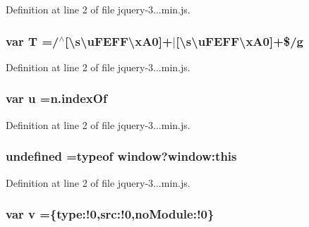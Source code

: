 Definition at line 2 of file jquery-\/3...\+min.\+js.

\subsubsection[{T}]{\setlength{\rightskip}{0pt plus 5cm}var T =/$^\wedge$[\textbackslash{}s\textbackslash{}u\+F\+E\+F\+F\textbackslash{}x\+A0]+$\vert$[\textbackslash{}s\textbackslash{}u\+F\+E\+F\+F\textbackslash{}x\+A0]+\$/{\bf g}}\label{jquery-3_83_81_8min_8js_aa798e0c32253f973f3154aa30c996eb2}


Definition at line 2 of file jquery-\/3...\+min.\+js.

\subsubsection[{u}]{\setlength{\rightskip}{0pt plus 5cm}var u =n.\+index\+Of}\label{jquery-3_83_81_8min_8js_accb4ce8dd4113ac0f510653e31809106}


Definition at line 2 of file jquery-\/3...\+min.\+js.

\subsubsection[{undefined}]{\setlength{\rightskip}{0pt plus 5cm}undefined =typeof window?window\+:this}\label{jquery-3_83_81_8min_8js_ae21cc36bf0d65014c717a481a3f8a468}


Definition at line 2 of file jquery-\/3...\+min.\+js.

\subsubsection[{v}]{\setlength{\rightskip}{0pt plus 5cm}var v =\{type\+:!0,src\+:!0,no\+Module\+:!0\}}\label{jquery-3_83_81_8min_8js_afc3dd12de12777f6e20b4c93b7e7cb96}


